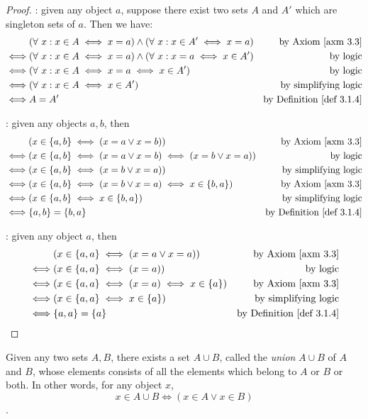\begin{proof}
: given any object \(a\), suppose there exist two sets \(A\) and \(A'\) which are singleton sets of \(a\). Then we have:
\begin{align*}
         & (\forall\ x : x \in A \iff x = a) \land (\forall\ x : x \in A' \iff x = a) & \text{by \AXM{3.3}} \\
    \iff & (\forall\ x : x \in A \iff x = a) \land (\forall\ x : x = a \iff x \in A') & \text{by logic} \\
    \iff & (\forall\ x : x \in A \iff x = a \iff x \in A')                            & \text{by logic} \\
    \iff & (\forall\ x : x \in A \iff x \in A')                                       & \text{by simplifying logic} \\
    \iff & A = A'                                                                     & \text{by \DEF{3.1.4}}
\end{align*}

: given any objects \(a, b\), then
\begin{align*}
    & (x \in \{a, b\} \iff (x = a \lor x = b)) & \text{by \AXM{3.3}} \\
    \iff & (x \in \{a, b\} \iff (x = a \lor x = b) \iff (x = b \lor x = a)) & \text{by logic} \\
    \iff & (x \in \{a, b\} \iff (x = b \lor x = a)) & \text{by simplifying logic} \\
    \iff & (x \in \{a, b\} \iff (x = b \lor x = a) \iff x \in \{b, a\}) & \text{by \AXM{3.3}} \\
    \iff & (x \in \{a, b\} \iff x \in \{b, a\}) & \text{by simplifying logic} \\
    \iff & \{a, b\} = \{b, a\} & \text{by \DEF{3.1.4}}
\end{align*}

: given any object \(a\), then
\begin{align*}
    & (x \in \{a, a\} \iff (x = a \lor x = a)) & \text{by \AXM{3.3}} \\
    \iff & (x \in \{a, a\} \iff (x = a)) & \text{by logic} \\
    \iff & (x \in \{a, a\} \iff (x = a) \iff x \in \{a\})& \text{by \AXM{3.3}} \\
    \iff & (x \in \{a, a\} \iff x \in \{a\})& \text{by simplifying logic} \\
    \iff & \{a, a\} = \{a\} & \text{by \DEF{3.1.4}}
\end{align*}
\end{proof}


\begin{axiom}  \label{axm 3.4}
Given any two sets \(A, B\), there exists a set \(A \cup B\), called the \emph{union} \(A \cup B\) of \(A\) and \(B\), whose elements consists of all the elements which belong to \(A\) or \(B\) or both. In other words, for any object \(x\),
\[
    x \in A \cup B \iff (x \in A \lor x \in B)
\].
\end{axiom}